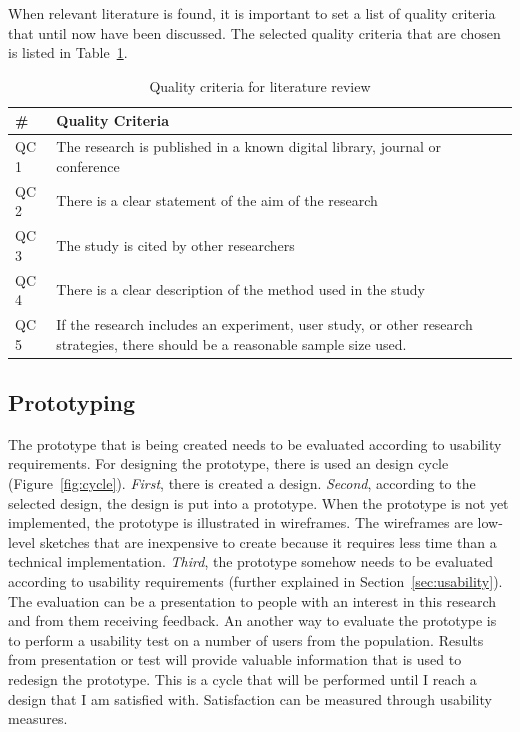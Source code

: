     When relevant literature is found, it is important to set a list of quality criteria that until now have been discussed.
    The selected quality criteria that are chosen is listed in Table~\ref{tab:QualityCriteria}.

      \begin{table}[H]
        \centering
        \begin{tabular}{| l | p{10cm} |}
          \hline
          {\bf \#} & {\bf Quality Criteria} \\ \hline
          QC 1 & The research is published in a known digital library, journal or conference\\ \hline
          QC 2 & There is a clear statement of the aim of the research\\ \hline
          QC 3 & The study is cited by other researchers\\ \hline
          QC 4 & There is a clear description of the method used in the study\\ \hline
          QC 5 & If the research includes an experiment, user study, or other research strategies, there should be a reasonable sample size used. \\ \hline
        \end{tabular}
        \caption{Quality criteria for literature review}
        \label{tab:QualityCriteria}
      \end{table}
    
    \subsection{Prototyping} \label{sec:methodusabilitytesting}
    The prototype that is being created needs to be evaluated according to usability requirements. For designing the prototype, there is used an design cycle (Figure~\ref{fig:cycle}). {\it First}, there is created a design. {\it Second}, according to the selected design, the design is put into a prototype. When the prototype is not yet implemented, the prototype is illustrated in wireframes. The wireframes are low-level sketches that are inexpensive to create because it requires less time than a technical implementation. {\it Third}, the prototype somehow needs to be evaluated according to usability requirements (further explained in Section~\ref{sec:usability}). The evaluation can be a presentation to people with an interest in this research and from them receiving feedback. An another way to evaluate the prototype is to perform a usability test on a number of users from the population. Results from presentation or test will provide valuable information that is used to redesign the prototype. This is a cycle that will be performed until I reach a design that I am satisfied with. Satisfaction can be measured through usability measures.

